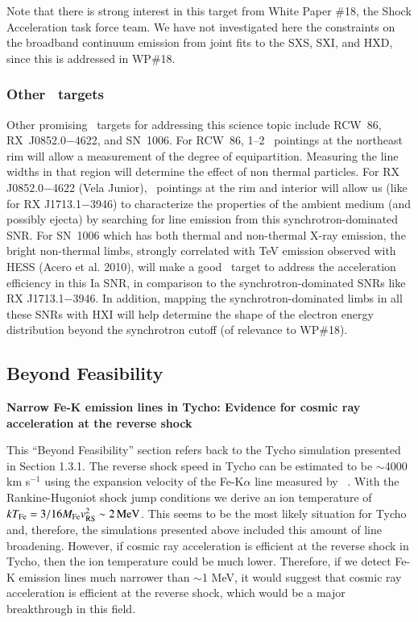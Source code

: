\documentclass[11pt,a4paper]{article}
\begin{document}
{Note that there is strong interest in this target from White Paper \#18, the Shock
Acceleration task force team.  We have not investigated here the
constraints on the broadband continuum emission from joint fits to the
SXS, SXI, and HXD, since this is addressed in WP\#18.

\subsubsection{Other \ah\ targets}
Other promising \ah\ targets for addressing this science topic include RCW~86, RX~J0852.0$-$4622, and SN~1006.
For  RCW~86, 1--2 \ah\ pointings at the northeast rim will allow a measurement of the degree of equipartition.
Measuring the line widths in that region will determine the effect of non thermal particles.
For RX J0852.0$-$4622 (Vela Junior), \ah\ pointings at the rim and interior will allow us  (like for RX J1713.1$-$3946)
to characterize the properties of the ambient medium (and possibly ejecta) 
by searching for line emission from this synchrotron-dominated SNR.
For SN~1006 which has both thermal and non-thermal X-ray emission, 
the bright non-thermal limbs, strongly correlated with TeV emission observed with HESS (Acero et al. 2010),
 will make a good \ah\ target to address the acceleration efficiency in this Ia SNR,
 in comparison to the synchrotron-dominated SNRs like RX J1713.1$-$3946.
In addition, mapping the synchrotron-dominated limbs in all these SNRs with HXI will help determine 
the shape of the electron energy distribution beyond the synchrotron cutoff
(of relevance to WP\#18).


\subsection{Beyond Feasibility}


{\bf Narrow Fe-K emission lines in Tycho: Evidence for cosmic ray
  acceleration at the reverse shock }

This ``Beyond Feasibility'' section refers back to the Tycho
simulation presented in Section 1.3.1.  The reverse shock speed in
Tycho can be estimated to be $\sim$4000 km s$^{-1}$ using the
expansion velocity of the Fe-K$\alpha$ line measured by
\suzaku\ \citep{hayato10}.  With the Rankine-Hugoniot shock jump
conditions we derive an ion temperature of $kT_{\rm Fe} = 3/16 M_{\rm
  Fe} v_{\rm RS}^2 \sim 2\, \rm MeV$.  This seems to be the most
likely situation for Tycho and, therefore, the simulations presented
above included this amount of line broadening. However, if cosmic ray
acceleration is efficient at the reverse shock in Tycho, then the ion
temperature could be much lower. Therefore, if we detect Fe-K emission
lines much narrower than $\sim$1 MeV, it would suggest that cosmic ray
acceleration is efficient at the reverse shock, which would be a
major breakthrough in this field.


}
\end{document}
